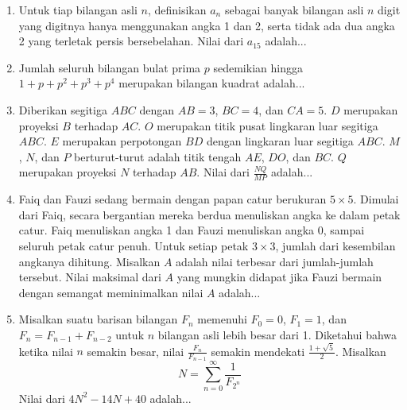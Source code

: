\documentclass[12pt]{scrartcl}
\begin{document}
\begin{enumerate}[resume]
    \item Untuk tiap bilangan asli $n$, definisikan $a_n$ sebagai banyak bilangan asli $n$ digit yang digitnya hanya menggunakan angka 1 dan 2, serta tidak ada dua angka 2 yang terletak persis bersebelahan. Nilai dari $a_{15}$ adalah...
    \item Jumlah seluruh bilangan bulat prima $p$ sedemikian hingga $1 + p + p^2 + p^3 + p^4$ merupakan bilangan kuadrat adalah...
    \item Diberikan segitiga $ABC$ dengan $AB = 3$, $BC = 4$, dan $CA = 5$. $D$ merupakan proyeksi $B$ terhadap $AC$. $O$ merupakan titik pusat lingkaran luar segitiga $ABC$. $E$ merupakan perpotongan $BD$ dengan lingkaran luar segitiga $ABC$. $M$, $N$, dan $P$ berturut-turut adalah titik tengah $AE$, $DO$, dan $BC$. $Q$ merupakan proyeksi $N$ terhadap $AB$. Nilai dari $\frac{NQ}{MP}$ adalah...
    \item Faiq dan Fauzi sedang bermain dengan papan catur berukuran $5 \times 5$. Dimulai dari Faiq, secara bergantian mereka berdua menuliskan angka ke dalam petak catur. Faiq menuliskan angka 1 dan Fauzi menuliskan angka 0, sampai seluruh petak catur penuh. Untuk setiap petak $3 \times 3$, jumlah dari kesembilan angkanya dihitung. Misalkan $A$ adalah nilai terbesar dari jumlah-jumlah tersebut. Nilai maksimal dari $A$ yang mungkin didapat jika Fauzi bermain dengan semangat meminimalkan nilai $A$ adalah...
    \item Misalkan suatu barisan bilangan $F_n$ memenuhi $F_0 = 0$, $F_1 = 1$, dan $F_n = F_{n-1} + F_{n-2}$ untuk $n$ bilangan asli lebih besar dari 1. Diketahui bahwa ketika nilai $n$ semakin besar, nilai $\frac{F_n}{F_{n-1}}$ semakin mendekati $\frac{1 + \sqrt{5}}{2}$. Misalkan
        $$N = \sum_{n=0}^\infty \frac{1}{F_{2^n}}$$
        Nilai dari $4N^2 - 14N + 40$ adalah...
\end{enumerate}
\end{document}
